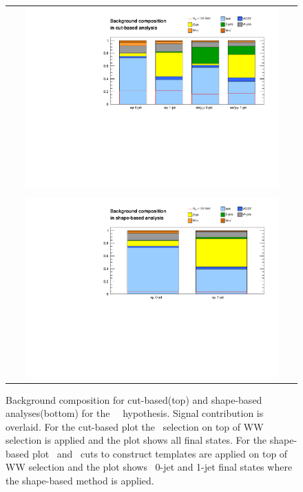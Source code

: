 \begin{figure}[htp] 
\centering 
\begin{tabular}{c} 
\includegraphics[width=0.9\textwidth]{figures/Bkgcomposition_cutbased.pdf} 
\\
\\
\includegraphics[width=0.9\textwidth]{figures/Bkgcomposition_2d.pdf} 
\end{tabular} 
\caption{Background composition for cut-based(top) and shape-based analyses(bottom) 
for the ~\GeV\ hypothesis. Signal contribution is overlaid. 
For the cut-based plot the \mHi\ selection on top of 
WW selection is applied and the plot shows all final states. 
For the shape-based plot \mT\ and \mll\ cuts to construct templates are applied 
on top of WW selection and the plot shows \DF\ 0-jet and 1-jet final states 
where the shape-based method is applied. 
} 
\label{fig:bkgcomposition} 
\end{figure} 

